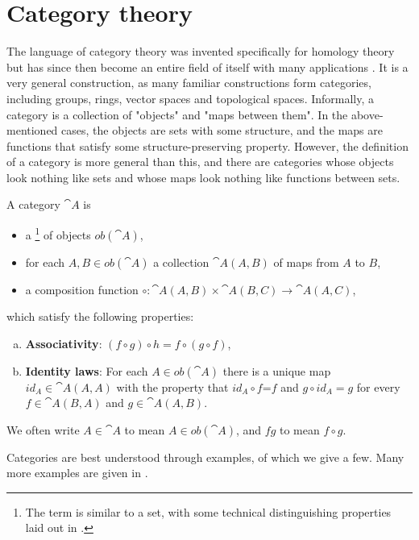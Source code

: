 \section{Category theory}\label{sec-category-theory}
The language of category theory was invented specifically for homology theory but has since then become an entire field of itself with many applications \cite{Marquis}. It is a very general construction, as many familiar constructions form categories, including groups, rings, vector spaces and topological spaces. Informally, a category is a collection of "objects" and "maps between them". In the above-mentioned cases, the objects are sets with some structure, and the maps are functions that satisfy some structure-preserving property. However, the definition of a category is more general than this, and there are categories whose objects look nothing like sets and whose maps look nothing like functions between sets.

\begin{definition}
A category $\cat{A}$ is
\begin{itemize}
    \item a \footnote{The term  is similar to a set, with some technical distinguishing properties laid out in \cite{Leinster}.} of objects $ob(\cat{A})$,
    \item for each $A,B\in ob(\cat{A})$ a collection $\cat{A}(A,B)$ of maps from $A$ to $B$,
    \item a composition function $\circ:\cat{A}(A,B)\times \cat{A}(B,C)\rightarrow \cat{A}(A,C)$,
\end{itemize}
which satisfy the following properties:

\begin{enumerate}[(a)]
\item \textbf{Associativity}: $(f\circ g)\circ h=f\circ(g\circ f)$,
\item \textbf{Identity laws}: For each $A\in ob(\cat{A})$ there is a unique map $id_A\in \cat{A}(A,A)$ with the property that $id_A\circ f$=$f$ and $g\circ id_A=g$ for every $f\in \cat{A}(B,A)$ and $g\in \cat{A}(A,B)$.
\end{enumerate}
\end{definition}
We often write $A\in \cat{A}$ to mean $A\in ob(\cat{A})$, and $fg$ to mean $f\circ g$.
\par Categories are best understood through examples, of which we give a few. Many more examples are given in \cite{Leinster}.


